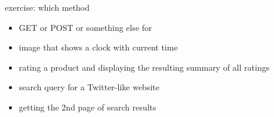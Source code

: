 \begin{frame}{exercise: which method}
    \begin{itemize}
    \item GET or POST or something else for
    \vspace{.5cm}
    \item image that shows a clock with current time
    \item rating a product and displaying the resulting summary of all ratings
    \item search query for a Twitter-like website
    \item getting the 2nd page of search results
    \end{itemize}
\end{frame}
